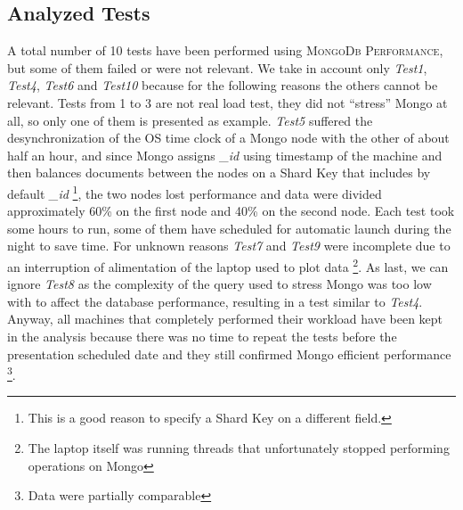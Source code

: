 \subsection{Analyzed Tests}
A total number of 10 tests have been performed using \textsc{MongoDb Performance}, but some of them failed or were not relevant.
We take in account only \textit{Test1}, \textit{Test4}, \textit{Test6} and \textit{Test10} because for the following reasons the others cannot be relevant.
Tests from 1 to 3 are not real load test, they did not “stress” Mongo at all, so only one of them is presented as example.
\textit{Test5} suffered the desynchronization of the OS time clock of a Mongo node with the other of about half an hour, and since Mongo assigns \textit{\_id} using timestamp of the machine and then balances documents between the nodes on a Shard Key that includes by default \textit{\_id} \footnote{This is a good reason to specify a Shard Key on a different field.}, the two nodes lost performance and data were divided approximately 60\% on the first node and 40\% on the second node. 
Each test  took some hours to run, some of them have scheduled for automatic launch during the night to save time.
For unknown reasons \textit{Test7} and  \textit{Test9} were incomplete due to an interruption of alimentation of the laptop used to plot data \footnote{The laptop itself was running threads that unfortunately stopped performing operations on Mongo}.
As last, we can ignore \textit{Test8} as the complexity of the query used to stress Mongo was too low with to affect the database performance, resulting in a test similar to \textit{Test4}.
Anyway, all machines that completely performed their workload have been kept in the analysis because there was no time to repeat the tests before the presentation scheduled date and they still confirmed Mongo efficient performance \footnote{Data were partially comparable}.

